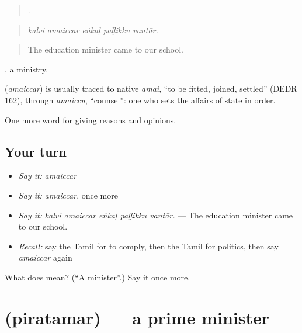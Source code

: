 \begin{quote}
    .
\end{quote}

\begin{quote}
\emph{kalvi amaiccar eṅkaḷ paḷḷikku vantār.}
\end{quote}

\begin{quote}
The education minister came to our school.
\end{quote}

, a ministry.

\begin{cousinweb}
\textbf{} (\emph{amaiccar}) is usually traced to native \emph{amai}, \textquotedblleft{}to be fitted, joined, settled\textquotedblright{} (DEDR 162), through \emph{amaiccu}, \textquotedblleft{}counsel\textquotedblright{}: one who sets the affairs of state in order.
\end{cousinweb}

\begin{grammarlens}[title={What you've built}]
One more word for giving reasons and opinions.
\end{grammarlens}

\subsection*{Your turn}
\begin{itemize}
\raggedright
  \item \emph{Say it:} \emph{amaiccar}
  \item \emph{Say it:} \emph{amaiccar}, once more
  \item \emph{Say it:} \emph{kalvi amaiccar eṅkaḷ paḷḷikku vantār.} — The education minister came to our school.
  \item \emph{Recall:} say the Tamil for to comply, then the Tamil for politics, then say \emph{amaiccar} again
\end{itemize}

\begin{tcolorbox}[breakable,colback=teal!4,colframe=teal!35!black,title={Before you move on}]
What does  mean? (\textquotedblleft{}A minister\textquotedblright{}.) Say it once more.
\end{tcolorbox}
\section[\texorpdfstring{\ta{பிரதமர்} (piratamar)}{பிரதமர் (piratamar)}]{ (piratamar) — a prime minister}

